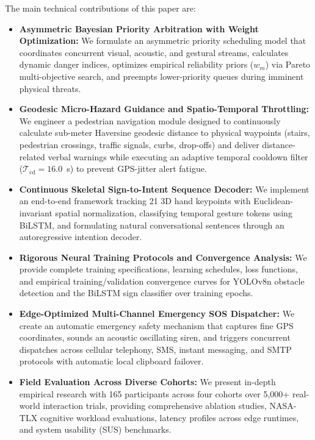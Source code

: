 \documentclass[conference]{IEEEtran}
\begin{document}
The main technical contributions of this paper are:
\begin{itemize}
    \item \textbf{Asymmetric Bayesian Priority Arbitration with Weight Optimization:} We formulate an asymmetric priority scheduling model that coordinates concurrent visual, acoustic, and gestural streams, calculates dynamic danger indices, optimizes empirical reliability priors ($w_m$) via Pareto multi-objective search, and preempts lower-priority queues during imminent physical threats.
    \item \textbf{Geodesic Micro-Hazard Guidance and Spatio-Temporal Throttling:} We engineer a pedestrian navigation module designed to continuously calculate sub-meter Haversine geodesic distance to physical waypoints (stairs, pedestrian crossings, traffic signals, curbs, drop-offs) and deliver distance-related verbal warnings while executing an adaptive temporal cooldown filter ($\mathcal{T}_{\text{cd}} = 16.0$~s) to prevent GPS-jitter alert fatigue.
    \item \textbf{Continuous Skeletal Sign-to-Intent Sequence Decoder:} We implement an end-to-end framework tracking 21 3D hand keypoints with Euclidean-invariant spatial normalization, classifying temporal gesture tokens using BiLSTM, and formulating natural conversational sentences through an autoregressive intention decoder.
    \item \textbf{Rigorous Neural Training Protocols and Convergence Analysis:} We provide complete training specifications, learning schedules, loss functions, and empirical training/validation convergence curves for YOLOv8n obstacle detection and the BiLSTM sign classifier over training epochs.
    \item \textbf{Edge-Optimized Multi-Channel Emergency SOS Dispatcher:} We create an automatic emergency safety mechanism that captures fine GPS coordinates, sounds an acoustic oscillating siren, and triggers concurrent dispatches across cellular telephony, SMS, instant messaging, and SMTP protocols with automatic local clipboard failover.
    \item \textbf{Field Evaluation Across Diverse Cohorts:} We present in-depth empirical research with 165 participants across four cohorts over 5,000+ real-world interaction trials, providing comprehensive ablation studies, NASA-TLX cognitive workload evaluations, latency profiles across edge runtimes, and system usability (SUS) benchmarks.
\end{itemize}
\end{document}
